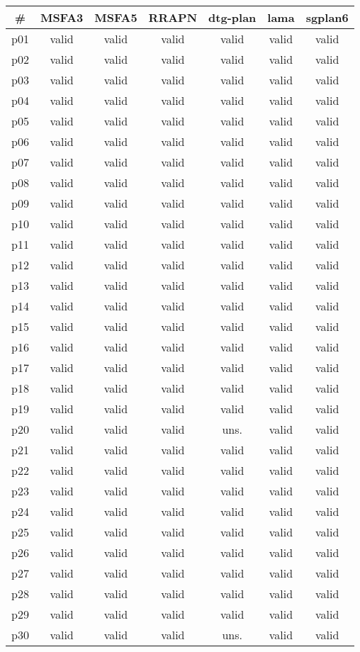 \begin{tabular}{ccccccc}
\toprule
\textbf{\#} & \textbf{MSFA3} & \textbf{MSFA5} & \textbf{RRAPN} & \textbf{dtg-plan} & \textbf{lama} & \textbf{sgplan6}\\
\midrule
p01 & valid & valid & valid & valid & valid & valid\\
p02 & valid & valid & valid & valid & valid & valid\\
p03 & valid & valid & valid & valid & valid & valid\\
p04 & valid & valid & valid & valid & valid & valid\\
p05 & valid & valid & valid & valid & valid & valid\\
p06 & valid & valid & valid & valid & valid & valid\\
p07 & valid & valid & valid & valid & valid & valid\\
p08 & valid & valid & valid & valid & valid & valid\\
p09 & valid & valid & valid & valid & valid & valid\\
p10 & valid & valid & valid & valid & valid & valid\\
p11 & valid & valid & valid & valid & valid & valid\\
p12 & valid & valid & valid & valid & valid & valid\\
p13 & valid & valid & valid & valid & valid & valid\\
p14 & valid & valid & valid & valid & valid & valid\\
p15 & valid & valid & valid & valid & valid & valid\\
p16 & valid & valid & valid & valid & valid & valid\\
p17 & valid & valid & valid & valid & valid & valid\\
p18 & valid & valid & valid & valid & valid & valid\\
p19 & valid & valid & valid & valid & valid & valid\\
p20 & valid & valid & valid & uns. & valid & valid\\
p21 & valid & valid & valid & valid & valid & valid\\
p22 & valid & valid & valid & valid & valid & valid\\
p23 & valid & valid & valid & valid & valid & valid\\
p24 & valid & valid & valid & valid & valid & valid\\
p25 & valid & valid & valid & valid & valid & valid\\
p26 & valid & valid & valid & valid & valid & valid\\
p27 & valid & valid & valid & valid & valid & valid\\
p28 & valid & valid & valid & valid & valid & valid\\
p29 & valid & valid & valid & valid & valid & valid\\
p30 & valid & valid & valid & uns. & valid & valid\\
\bottomrule
\end{tabular}

